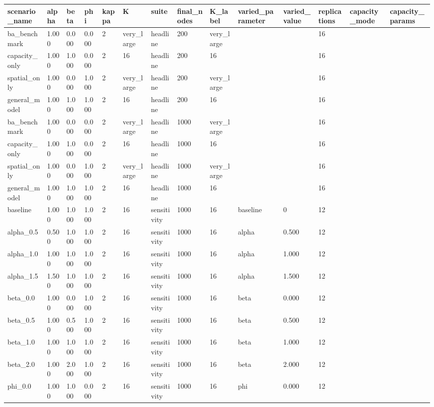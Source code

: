 \begin{tabular}{llllllllllllll}
\toprule
scenario\_name & alpha & beta & phi & kappa & K & suite & final\_nodes & K\_label & varied\_parameter & varied\_value & replications & capacity\_mode & capacity\_params \\
\midrule
ba\_benchmark & 1.000 & 0.000 & 0.000 & 2 & very\_large & headline & 200 & very\_large &  &  & 16 &  &  \\
capacity\_only & 1.000 & 1.000 & 0.000 & 2 & 16 & headline & 200 & 16 &  &  & 16 &  &  \\
spatial\_only & 1.000 & 0.000 & 1.000 & 2 & very\_large & headline & 200 & very\_large &  &  & 16 &  &  \\
general\_model & 1.000 & 1.000 & 1.000 & 2 & 16 & headline & 200 & 16 &  &  & 16 &  &  \\
ba\_benchmark & 1.000 & 0.000 & 0.000 & 2 & very\_large & headline & 1000 & very\_large &  &  & 16 &  &  \\
capacity\_only & 1.000 & 1.000 & 0.000 & 2 & 16 & headline & 1000 & 16 &  &  & 16 &  &  \\
spatial\_only & 1.000 & 0.000 & 1.000 & 2 & very\_large & headline & 1000 & very\_large &  &  & 16 &  &  \\
general\_model & 1.000 & 1.000 & 1.000 & 2 & 16 & headline & 1000 & 16 &  &  & 16 &  &  \\
baseline & 1.000 & 1.000 & 1.000 & 2 & 16 & sensitivity & 1000 & 16 & baseline & 0 & 12 &  &  \\
alpha\_0.5 & 0.500 & 1.000 & 1.000 & 2 & 16 & sensitivity & 1000 & 16 & alpha & 0.500 & 12 &  &  \\
alpha\_1.0 & 1.000 & 1.000 & 1.000 & 2 & 16 & sensitivity & 1000 & 16 & alpha & 1.000 & 12 &  &  \\
alpha\_1.5 & 1.500 & 1.000 & 1.000 & 2 & 16 & sensitivity & 1000 & 16 & alpha & 1.500 & 12 &  &  \\
beta\_0.0 & 1.000 & 0.000 & 1.000 & 2 & 16 & sensitivity & 1000 & 16 & beta & 0.000 & 12 &  &  \\
beta\_0.5 & 1.000 & 0.500 & 1.000 & 2 & 16 & sensitivity & 1000 & 16 & beta & 0.500 & 12 &  &  \\
beta\_1.0 & 1.000 & 1.000 & 1.000 & 2 & 16 & sensitivity & 1000 & 16 & beta & 1.000 & 12 &  &  \\
beta\_2.0 & 1.000 & 2.000 & 1.000 & 2 & 16 & sensitivity & 1000 & 16 & beta & 2.000 & 12 &  &  \\
phi\_0.0 & 1.000 & 1.000 & 0.000 & 2 & 16 & sensitivity & 1000 & 16 & phi & 0.000 & 12 &  &  \\

\end{tabular}
